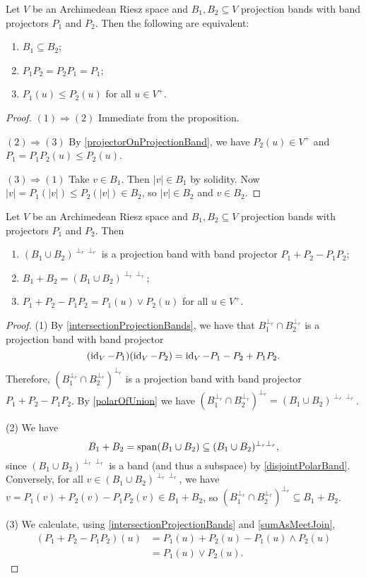 \begin{corollary}
Let $V$ be an Archimedean Riesz space and $B_1,B_2\subseteq V$ projection bands with band projectors $P_1$ and $P_2$. Then the following are equivalent:
\begin{enumerate}
\item $B_1 \subseteq B_2$;
\item $P_1P_2 = P_2P_1 = P_1$;
\item $P_1(u) \leq P_2(u)$ for all $u\in V^+$.
\end{enumerate}
\end{corollary}
\begin{proof}
$(1) \Rightarrow (2)$ Immediate from the proposition.

$(2) \Rightarrow (3)$ By \ref{projectorOnProjectionBand}, we have $P_2(u) \in V^+$ and $P_1 = P_1P_2(u) \leq P_2(u)$.

$(3) \Rightarrow (1)$ Take $v\in B_1$. Then $|v| \in B_1$ by solidity. Now $|v| = P_1(|v|) \leq P_2(|v|) \in B_2$, so $|v| \in B_2$ and $v\in B_2$.
\end{proof}

\begin{proposition} \label{sumProjectionBands}
Let $V$ be an Archimedean Riesz space and $B_1,B_2\subseteq V$ projection bands with projectors $P_1$ and $P_2$. Then
\begin{enumerate}
\item $(B_1 \cup B_2)^{\perp_r\perp_r}$ is a projection band with band projector $P_1 + P_2 - P_1P_2$;
\item $B_1 + B_2 = (B_1 \cup B_2)^{\perp_r\perp_r}$;
\item $P_1 + P_2 - P_1P_2 = P_1(u)\vee P_2(u)$ for all $u\in V^+$.
\end{enumerate}
\end{proposition}
\begin{proof}
(1) By \ref{intersectionProjectionBands}, we have that $B_1^{\perp_r}\cap B_2^{\perp_r}$ is a projection band with band projector
\[ (\operatorname{id}_V - P_1)(\operatorname{id}_V - P_2) = \operatorname{id}_V - P_1 - P_2 + P_1P_2. \]
Therefore, $(B_1^{\perp_r}\cap B_2^{\perp_r})^{\perp_r}$ is a projection band with band projector $P_1 + P_2 - P_1P_2$. By \ref{polarOfUnion} we have $(B_1^{\perp_r}\cap B_2^{\perp_r})^{\perp_r} = (B_1 \cup B_2)^{\perp_r\perp_r}$.

(2) We have
\[ B_1 + B_2 = \operatorname{span}(B_1 \cup B_2) \subseteq (B_1 \cup B_2)^{\perp_r\perp_r}, \]
since $(B_1 \cup B_2)^{\perp_r\perp_r}$ is a band (and thus a subspace) by \ref{disjointPolarBand}. Conversely, for all $v\in (B_1 \cup B_2)^{\perp_r\perp_r}$, we have $v = P_1(v) + P_2(v) - P_1P_2(v) \in B_1 + B_2$, so $(B_1^{\perp_r}\cap B_2^{\perp_r})^{\perp_r} \subseteq B_1 + B_2$.

(3) We calculate, using \ref{intersectionProjectionBands} and \ref{sumAsMeetJoin},
\begin{align*}
(P_1 + P_2 - P_1P_2)(u) &= P_1(u) + P_2(u) - P_1(u)\wedge P_2(u) \\
&= P_1(u)\vee P_2(u).
\end{align*}
\end{proof}


